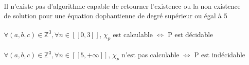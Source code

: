 \documentclass[12pt]{article}   %
\begin{document}
~\\\\Il n'existe pas d'algorithme capable de retourner l'existence ou la non-existence de solution pour une équation dophantienne de degré supérieur ou égal à 5
\\\\ \begin{math}\forall(a,b,c)\in\mathbb{Z}^3, \forall n\in[\![0,3]\!]\end{math}, \begin{math}\chi _{p}\end{math} est calculable \begin{math}\Longleftrightarrow\end{math} P est décidable
\\\\ \begin{math}\forall(a,b,c)\in\mathbb{Z}^3, \forall n\in[\![5,+\infty]\!]\end{math}, \begin{math}\chi _{p}\end{math} n'est pas calculable \begin{math}\Longleftrightarrow\end{math} P est indécidable
\end{document}
